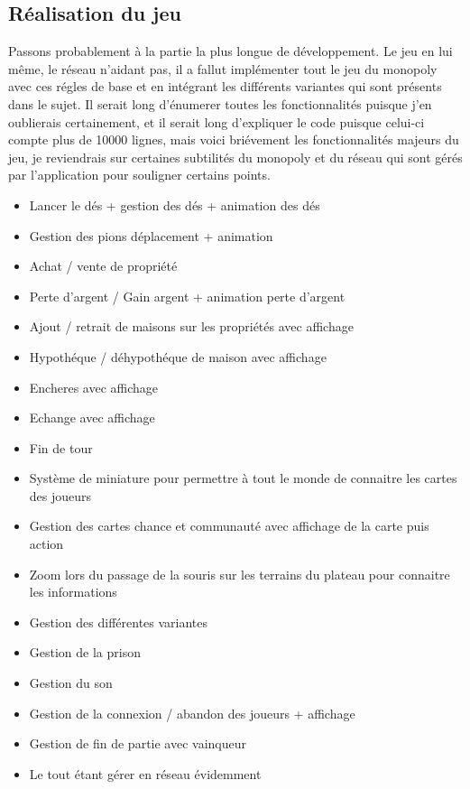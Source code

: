 \documentclass[12pt, openany]{report}
\begin{document}
	\subsection{Réalisation du jeu}
	Passons probablement à la partie la plus longue de développement. Le jeu en lui même, le réseau n'aidant pas, il a fallut implémenter tout le jeu du monopoly avec ces régles de base et en intégrant les différents variantes qui sont présents dans le sujet.
Il serait long d'énumerer toutes les fonctionnalités puisque j'en oublierais certainement, et il serait long d'expliquer le code puisque celui-ci compte plus de 10000 lignes, mais voici briévement les fonctionnalités majeurs du jeu, je reviendrais sur certaines subtilités du monopoly et du réseau qui sont gérés par l'application pour souligner certains points.
	\begin{itemize}
	    \item Lancer le dés + gestion des dés + animation des dés
	    \item Gestion des pions déplacement + animation 
	    \item Achat / vente de propriété
	    \item Perte d'argent / Gain argent + animation perte d'argent
	    \item Ajout / retrait de maisons sur les propriétés avec affichage
	    \item Hypothéque / déhypothéque de maison avec affichage
	    \item Encheres avec affichage
	    \item Echange avec affichage
	    \item Fin de tour
	    \item Système de miniature pour permettre à tout le monde de connaitre les cartes des joueurs
	    \item Gestion des cartes chance et communauté avec affichage de la carte puis action
	    \item Zoom lors du passage de la souris sur les terrains du plateau pour connaitre les informations 
	    \item Gestion des différentes variantes
	    \item Gestion de la prison
	    \item Gestion du son
	    \item Gestion de la connexion / abandon des joueurs + affichage
	    \item Gestion de fin de partie avec vainqueur
	    \item Le tout étant gérer en réseau évidemment
	\end{itemize} 
\end{document}
